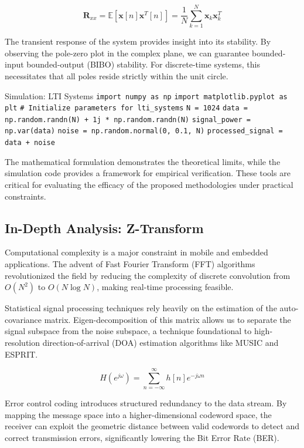 \begin{equation}
    \mathbf{R}_{xx} = \mathbb{E}[\mathbf{x}[n]\mathbf{x}^T[n]] = \frac{1}{N} \sum_{k=1}^{N} \mathbf{x}_k \mathbf{x}_k^T
\end{equation}

The transient response of the system provides insight into its stability. By observing the pole-zero plot in the complex plane, we can guarantee bounded-input bounded-output (BIBO) stability. For discrete-time systems, this necessitates that all poles reside strictly within the unit circle.

\begin{pythonbox}{Simulation: LTI Systems}
\texttt{import numpy as np}
\texttt{import matplotlib.pyplot as plt}
\texttt{}
\texttt{\# Initialize parameters for lti\_systems}
\texttt{N = 1024}
\texttt{data = np.random.randn(N) + 1j * np.random.randn(N)}
\texttt{signal\_power = np.var(data)}
\texttt{noise = np.random.normal(0, 0.1, N)}
\texttt{processed\_signal = data + noise}
\end{pythonbox}

\vspace{0.5cm}
The mathematical formulation demonstrates the theoretical limits, while the simulation code provides a framework for empirical verification. These tools are critical for evaluating the efficacy of the proposed methodologies under practical constraints.


\subsection{In-Depth Analysis: Z-Transform}
Computational complexity is a major constraint in mobile and embedded applications. The advent of Fast Fourier Transform (FFT) algorithms revolutionized the field by reducing the complexity of discrete convolution from $O(N^2)$ to $O(N \log N)$, making real-time processing feasible.

Statistical signal processing techniques rely heavily on the estimation of the auto-covariance matrix. Eigen-decomposition of this matrix allows us to separate the signal subspace from the noise subspace, a technique foundational to high-resolution direction-of-arrival (DOA) estimation algorithms like MUSIC and ESPRIT.

\begin{equation}
    H(e^{j\omega}) = \sum_{n=-\infty}^{\infty} h[n] e^{-j\omega n}
\end{equation}

Error control coding introduces structured redundancy to the data stream. By mapping the message space into a higher-dimensional codeword space, the receiver can exploit the geometric distance between valid codewords to detect and correct transmission errors, significantly lowering the Bit Error Rate (BER).

